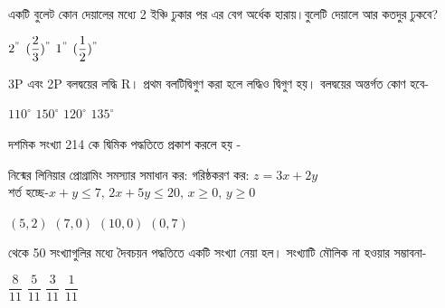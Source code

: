 \documentclass[addpoints]{exam}
\begin{document}
\begin{questions}
\begin{oneparchoices}
\end{oneparchoices}

\question  একটি বুলেট কোন দেয়ালের মধ্যে 2 ইঞ্চি ঢুকার পর এর বেগ অর্ধেক হারায়।বুলেটি দেয়ালে আর কতদুর ঢুকবে?

\begin{oneparchoices}
\choice $ 2^{"} $
\choice $ (\dfrac{2}{3})^{"} $
\choice $ 1^{"} $
\choice $ (\dfrac{1}{2})^{"} $

\end{oneparchoices}

\question  3P এবং 2P বলদ্বয়ের লদ্ধি R। প্রথম বলটিদ্বিগুণ করা হলে লদ্ধিও দ্বিগুণ হয়। বলদ্বয়ের অন্তর্গত কোণ হবে-

\begin{oneparchoices}
\choice $ 110^{\circ} $
\choice $ 150^{\circ} $
\choice $ 120^{\circ} $
\choice $ 135^{\circ} $

\end{oneparchoices}

\question দশমিক সংখ্যা 214 কে দ্বিমিক পদ্ধতিতে প্রকাশ করলে হয় - 

\begin{oneparchoices}
\end{oneparchoices}



\question নিন্মের লিনিয়ার প্রোগ্রামিং সমস্যার সমাধান কর:
গরিষ্ঠকরণ কর: $ z=3x+2y $\\
শর্ত হচ্ছে-$ x+y\le 7,\, 2x+5y\le 20,\, x\ge 0,\,y\ge 0 $


\begin{oneparchoices}
\choice $ (5,2) $
\choice $ (7,0) $
\choice $ (10,0) $
\choice $ (0,7) $
\end{oneparchoices}

 থেকে 50 সংখ্যাগুলির মধ্যে দৈবচয়ন পদ্ধতিতে একটি সংখ্যা নেয়া হল। সংখ্যাটি মৌলিক না হওয়ার সম্ভাবনা-

\begin{oneparchoices}
\choice $ \dfrac{8}{11} $
\choice  $ \dfrac{5}{11} $
\choice $ \dfrac{3}{11} $
\choice $ \dfrac{1}{11} $

\end{oneparchoices}

\end{questions}
\end{document}
